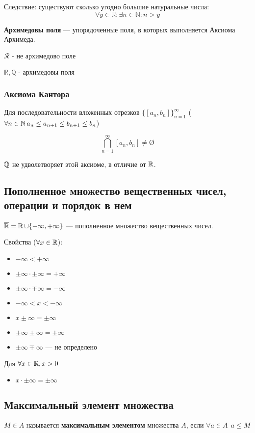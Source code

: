 Следствие: существуют сколько угодно большие натуральные числа: $$\forall y\in \mathbb{R}: \exists n\in\mathbb{N}: n>y$$

\textbf{Архимедовы поля} --- упорядоченные поля, в которых выполняется Аксиома Архимеда.

$\mathcal{R}$ - не архимедово поле

$\mathbb{R}, \mathbb{Q}$ - архимедовы поля

\subsubsection{Аксиома Кантора}

Для последовательности вложенных отрезков $\{[a_n,b_n]\}_{n=1}^\infty$ ($\forall n\in\operatorname*{\mathbb{N}} a_n\leq a_{n+1}\leq b_{n+1}\leq b_n$)

$$\bigcap\limits_{n=1}^\infty[a_n, b_n] \not = \text{\O}$$

$\operatorname*{\mathbb{Q}}$ не удволетворяет этой аксиоме, в отличие от $\operatorname*{\mathbb{R}}$.

\subsection{Пополненное множество вещественных чисел, операции и порядок в нем}

$\overline{\operatorname*{\mathbb{R}}}=\operatorname*{\mathbb{R}}\cup\{-\infty, +\infty\}$ --- пополненное множество вещественных чисел.

Свойства ($\forall x\in\operatorname*{\mathbb{R}}$):
\begin{itemize}
    \itemsep0em
    \item $-\infty<+\infty$
    \item $\pm\infty\cdot\pm\infty=+\infty$
    \item $\pm\infty\cdot\mp\infty=-\infty$
    \item $-\infty<x<-\infty$
    \item $x\pm\infty=\pm\infty$
    \item $\pm\infty\pm\infty=\pm\infty$
    \item $\pm\infty\mp\infty$ --- не определено
\end{itemize}

Для $\forall x\in\operatorname*{\mathbb{R}}, x>0$
\begin{itemize}
    \item $x\cdot\pm\infty=\pm\infty$
\end{itemize}

\subsection{Максимальный элемент множества}
$M\in A$ называется \textbf{максимальным элементом} множества $A$, если $\forall a\in A \ \ a\leq M$

